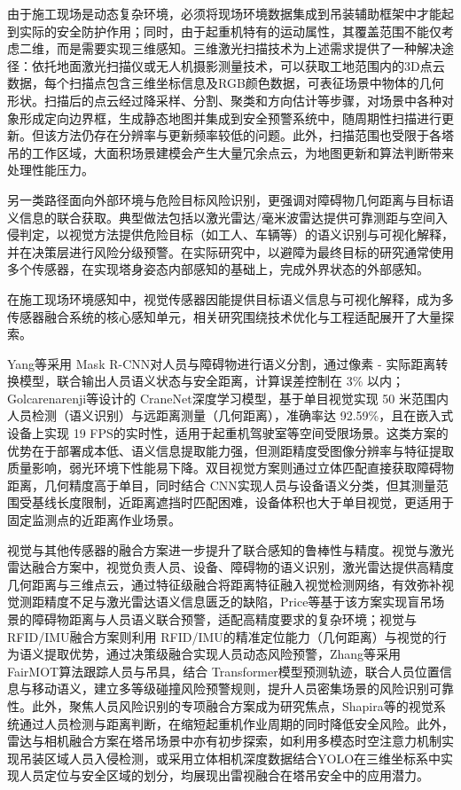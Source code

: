 由于施工现场是动态复杂环境，必须将现场环境数据集成到吊装辅助框架中才能起到实际的安全防护作用；同时，由于起重机特有的运动属性，其覆盖范围不能仅考虑二维，而是需要实现三维感知。三维激光扫描技术为上述需求提供了一种解决途径：依托地面激光扫描仪或无人机摄影测量技术\cite{G4AVEHSG}，可以获取工地范围内的3D点云数据，每个扫描点包含三维坐标信息及RGB颜色数据，可表征场景中物体的几何形状。扫描后的点云经过降采样、分割、聚类和方向估计等步骤，对场景中各种对象形成定向边界框，生成静态地图并集成到安全预警系统中，随周期性扫描进行更新\cite{NN865XZQ,K9J9CXIH}。但该方法仍存在分辨率与更新频率较低的问题。此外，扫描范围也受限于各塔吊的工作区域，大面积场景建模会产生大量冗余点云，为地图更新和算法判断带来处理性能压力。

另一类路径面向外部环境与危险目标风险识别，更强调对障碍物几何距离与目标语义信息的联合获取。典型做法包括以激光雷达/毫米波雷达提供可靠测距与空间入侵判定，以视觉方法提供危险目标（如工人、车辆等）的语义识别与可视化解释，并在决策层进行风险分级预警。在实际研究中，以避障为最终目标的研究通常使用多个传感器，在实现塔身姿态内部感知的基础上，完成外界状态的外部感知。

在施工现场环境感知中，视觉传感器因能提供目标语义信息与可视化解释，成为多传感器融合系统的核心感知单元，相关研究围绕技术优化与工程适配展开了大量探索。

Yang等\cite{8FY5FXQ3}采用 Mask R-CNN对人员与障碍物进行语义分割，通过像素 - 实际距离转换模型，联合输出人员语义状态与安全距离，计算误差控制在 3\% 以内；Golcarenarenji等\cite{MHXEXK6X}设计的 CraneNet深度学习模型，基于单目视觉实现 50 米范围内人员检测（语义识别）与远距离测量（几何距离），准确率达 92.59\%，且在嵌入式设备上实现 19 FPS的实时性，适用于起重机驾驶室等空间受限场景。这类方案的优势在于部署成本低、语义信息提取能力强，但测距精度受图像分辨率与特征提取质量影响，弱光环境下性能易下降。双目视觉方案则通过立体匹配直接获取障碍物距离，几何精度高于单目，同时结合 CNN实现人员与设备语义分类，但其测量范围受基线长度限制，近距离遮挡时匹配困难，设备体积也大于单目视觉，更适用于固定监测点的近距离作业场景。

视觉与其他传感器的融合方案进一步提升了联合感知的鲁棒性与精度。视觉与激光雷达融合方案中，视觉负责人员、设备、障碍物的语义识别，激光雷达提供高精度几何距离与三维点云，通过特征级融合将距离特征融入视觉检测网络，有效弥补视觉测距精度不足与激光雷达语义信息匮乏的缺陷，Price等\cite{NN865XZQ}基于该方案实现盲吊场景的障碍物距离与人员语义联合预警，适配高精度要求的复杂环境；视觉与RFID/IMU融合方案则利用 RFID/IMU的精准定位能力（几何距离）与视觉的行为语义提取优势，通过决策级融合实现人员动态风险预警，Zhang等\cite{G47UYPFK}采用 FairMOT算法跟踪人员与吊具，结合 Transformer模型预测轨迹，联合人员位置信息与移动语义，建立多等级碰撞风险预警规则，提升人员密集场景的风险识别可靠性。此外，聚焦人员风险识别的专项融合方案成为研究焦点，Shapira等\cite{KC3A3Q33}的视觉系统通过人员检测与距离判断，在缩短起重机作业周期的同时降低安全风险。此外，雷达与相机融合方案在塔吊场景中亦有初步探索，如利用多模态时空注意力机制实现吊装区域人员入侵检测\cite{1}，或采用立体相机深度数据结合YOLO在三维坐标系中实现人员定位与安全区域的划分\cite{2}，均展现出雷视融合在塔吊安全中的应用潜力。

